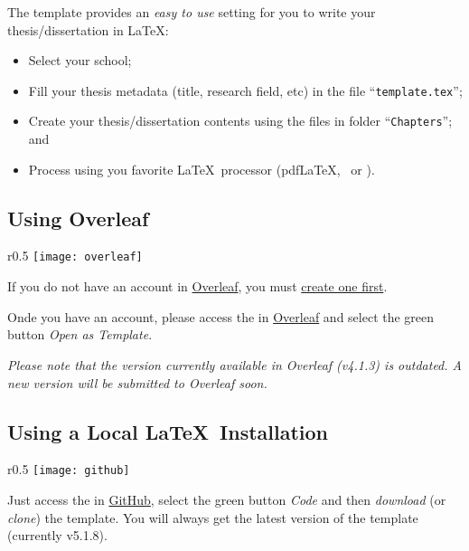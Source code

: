 The template provides an \emph{easy to use} setting for you to write your thesis/dissertation in \LaTeX:
\begin{itemize}
  \item  Select your school;
  \item Fill your thesis metadata (title, research field, etc) in the file “\texttt{template.tex}”;
  \item Create your thesis/dissertation contents using the files in folder “\texttt{Chapters}”; and
  \item Process using you favorite \LaTeX\ processor (pdf\LaTeX, \XeLaTeX\ or \LuaLaTeX).
\end{itemize}

\subsection{Using Overleaf}
\label{sub:using_overleaf}

\begin{wrapfigure}{r}{0.5\linewidth}
\vspace*{-15ex}\texttt{[image: overleaf]}%
\end{wrapfigure}

If you do not have an account in \href{https://www.overleaf.com?r=f5160636&rm=d&rs=b}{Overleaf}, you must \href{https://www.overleaf.com?r=f5160636&rm=d&rs=b}{create one first}.

Onde you have an account, please access the  in \href{https://www.overleaf.com/latex/templates/new-university-of-lisbon-universidade-nova-de-lisboa-slash-unl-thesis-template/fwbztcrptjmg}{Overleaf} and select the green button \emph{Open as Template}. 

\emph{Please note that the version currently available in Overleaf (v4.1.3) is outdated. A new version will be submitted to Overleaf soon.}  

\subsection{Using a Local \LaTeX\ Installation}
\label{sub:using_local_latex}

\begin{wrapfigure}{r}{0.5\linewidth}
\vspace*{-15ex}\texttt{[image: github]}%
\end{wrapfigure}

Just access the  in \href{https://github.com/joaomlourenco/novathesis}{GitHub}, select the green button \emph{Code} and then \emph{download} (or \emph{clone}) the template.  You will always get the latest version of the template (currently v5.1.8).


